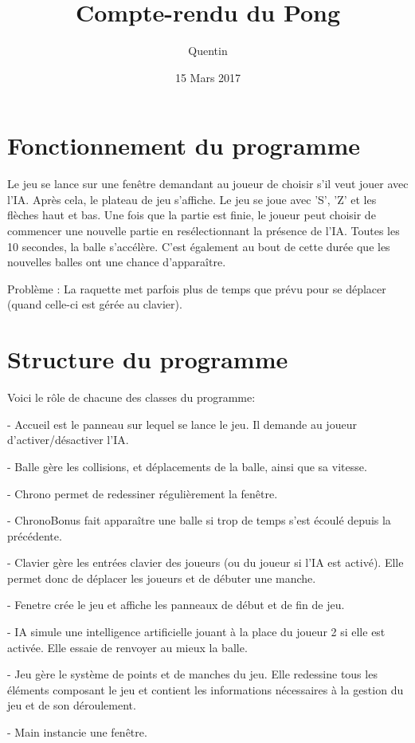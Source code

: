 \documentclass{report}
\title{Compte-rendu du Pong}
\author{Quentin \bsc{SAUVAGE}}
\date{15 Mars 2017}
\begin{document}
\maketitle
\chapter{Fonctionnement du programme}
Le jeu se lance sur une fenêtre demandant au joueur de choisir s'il veut jouer avec l'IA. Après cela, le plateau de jeu s'affiche. Le jeu se joue avec 'S', 'Z' et les flèches haut et bas. Une fois que la partie est finie, le joueur peut choisir de commencer une nouvelle partie en resélectionnant la présence de l'IA. Toutes les 10 secondes, la balle s'accélère. C'est également au bout de cette durée que les nouvelles balles ont une chance d'apparaître.

Problème : La raquette met parfois plus de temps que prévu pour se déplacer (quand celle-ci est gérée au clavier).

\chapter{Structure du programme}

Voici le rôle de chacune des classes du programme:

- Accueil est le panneau sur lequel se lance le jeu. Il demande au joueur d'activer/désactiver l'IA.

- Balle gère les collisions, et déplacements de la balle, ainsi que sa vitesse.

- Chrono permet de redessiner régulièrement la fenêtre.

- ChronoBonus fait apparaître une balle si trop de temps s'est écoulé depuis la précédente.

- Clavier gère les entrées clavier des joueurs (ou du joueur si l'IA est activé). Elle permet donc de déplacer les joueurs et de débuter une manche.

- Fenetre crée le jeu et affiche les panneaux de début et de fin de jeu.

- IA simule une intelligence artificielle jouant à la place du joueur 2 si elle est activée. Elle essaie de renvoyer au mieux la balle.

- Jeu gère le système de points et de manches du jeu. Elle redessine tous les éléments composant le jeu et contient les informations nécessaires à la gestion du jeu et de son déroulement.

- Main instancie une fenêtre.
\end{document}

